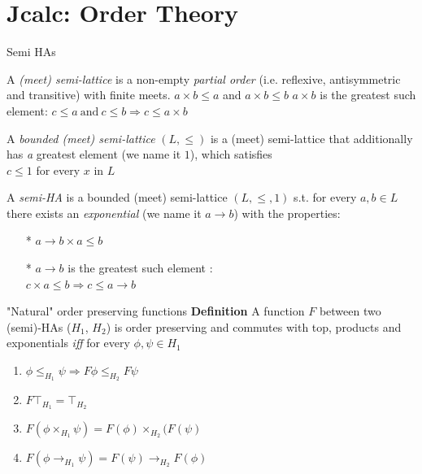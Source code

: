 \documentclass{beamer}
\begin{document}
\section{Jcalc: Order Theory}
\begin{frame}{Semi HAs}
  \begin{outline}
  \1[!] A \textit{(meet) semi-lattice} is a non-empty \emph{partial order} 
  (i.e. reflexive, antisymmetric and transitive) 
  with finite meets.
  \2[*] $a\times b \le a$ and $a\times b\le b$ 
  \2[*] $a \times b$ is the greatest such element:
        $c\le a \ \text{and} \ c\le b \Longrightarrow c\le a\times b$
  
 \1[!]
  A \textit{bounded (meet) semi-lattice} $(L,\le)$ is a (meet) 
  semi-lattice that additionally has 
  \2[*] \emph a {greatest element} (we name it $1$), which satisfies\\
  $c \le 1$ for every $x$ in $L$  
  \end{outline}
  \end{frame}
\begin{frame}
  \begin{outline}
 \1[!] A \textit{semi-HA} is a bounded (meet) semi-lattice $(L,\le, 1)$ 
 s.t. for every $a,b\in L$ there exists an \textit{exponential} 
 (we name it $a\rightarrow b$) 
 with the properties: 
 \begin{itemize}
 \item[*] $a\rightarrow b\times a\le b $
 \item[*] $a\rightarrow b$ is the greatest such element : \\ $c\times a\le b \Longrightarrow c\le a\rightarrow b $
 \end{itemize}
  \end{outline}
\end{frame}
\begin{frame}{"Natural" order preserving functions}
  \textbf{Definition}
  A function $F$ between two (semi)-HAs ($H_1$, $H_2$)
   is order preserving
  and commutes with top, products and exponentials \emph{iff} for every 
  $\phi,\psi \in H_1$
    \begin{enumerate}
    \item $\phi\le_{H_1}\psi\Rightarrow F\phi\le_{H_2}F\psi$
    \item $F\top_{H_1} = \top_{H_2}$ 
    \item{$F(\phi \times_{H_1}\psi) = F(\phi)\times_{H_2}(F(\psi)$} 
    \item $F(\phi\rightarrow_{H_1} \psi) = F(\psi)\rightarrow_{H_2} F(\phi)$
    \end{enumerate}    
  \end{frame}
\end{document}
